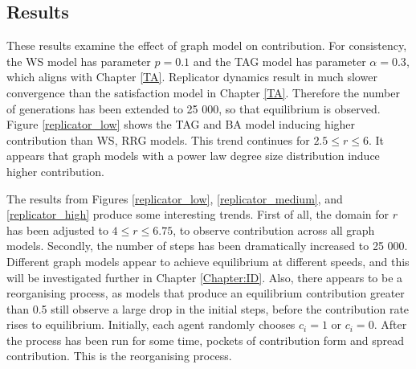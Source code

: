 \subsection{Results}
These results examine the effect of graph model on contribution. For consistency, the WS model has parameter $p=0.1$ and the TAG model has parameter $\alpha = 0.3$, which aligns with Chapter \ref{TA}. Replicator dynamics result in much slower convergence than the satisfaction model in Chapter \ref{TA}. Therefore the number of generations has been extended to 25 000, so that equilibrium is observed. Figure \ref{replicator_low} shows the TAG and BA model inducing higher contribution than WS, RRG models. This trend continues for $2.5 \leq r \leq 6$. It appears that graph models with a power law degree size distribution induce higher contribution. 
\FloatBarrier
{} 
\FloatBarrier
{}
\FloatBarrier
{}\FloatBarrier

The results from Figures \ref{replicator_low}, \ref{replicator_medium}, and \ref{replicator_high} produce some interesting trends. First of all, the domain for $r$ has been adjusted to $4\leq r \leq 6.75$, to observe contribution across all graph models. Secondly, the number of steps has been dramatically increased to 25 000. Different graph models appear to achieve equilibrium at different speeds, and this will be investigated further in Chapter \ref{Chapter:ID}. Also, there appears to be a reorganising process, as models that produce an equilibrium contribution greater than 0.5 still observe a large drop in the initial steps, before the contribution rate rises to equilibrium. Initially, each agent randomly chooses $c_i = 1$ or $c_i = 0$. After the process has been run for some time, pockets of contribution form and spread contribution. This is the reorganising process. \\

